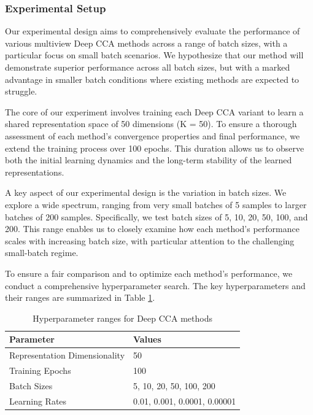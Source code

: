 \subsubsection{Experimental Setup}

Our experimental design aims to comprehensively evaluate the performance of various multiview Deep CCA methods across a range of batch sizes, with a particular focus on small batch scenarios. We hypothesize that our method will demonstrate superior performance across all batch sizes, but with a marked advantage in smaller batch conditions where existing methods are expected to struggle.

The core of our experiment involves training each Deep CCA variant to learn a shared representation space of 50 dimensions (K = 50). To ensure a thorough assessment of each method's convergence properties and final performance, we extend the training process over 100 epochs. This duration allows us to observe both the initial learning dynamics and the long-term stability of the learned representations.

A key aspect of our experimental design is the variation in batch sizes. We explore a wide spectrum, ranging from very small batches of 5 samples to larger batches of 200 samples. Specifically, we test batch sizes of 5, 10, 20, 50, 100, and 200. This range enables us to closely examine how each method's performance scales with increasing batch size, with particular attention to the challenging small-batch regime.

To ensure a fair comparison and to optimize each method's performance, we conduct a comprehensive hyperparameter search. The key hyperparameters and their ranges are summarized in Table \ref{tab:hyperparameters}.

\begin{table}[h!]
    \centering
    \caption{Hyperparameter ranges for Deep CCA methods}
    \label{tab:hyperparameters}
    \begin{tabular}{|l|l|}
        \hline
        Parameter                   & Values                    \\
        \hline
        Representation Dimensionality & 50                        \\
        Training Epochs             & 100                       \\
        Batch Sizes                 & 5, 10, 20, 50, 100, 200   \\
        Learning Rates              & 0.01, 0.001, 0.0001, 0.00001 \\
        \hline
    \end{tabular}
\end{table}

